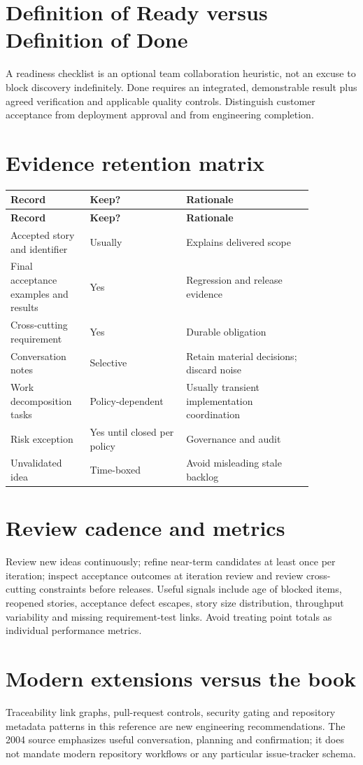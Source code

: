 \documentclass[11pt,letterpaper]{article}
\begin{document}
\section{Definition of Ready versus Definition of Done}
A readiness checklist is an optional team collaboration heuristic, not an excuse to block discovery indefinitely. Done requires an integrated, demonstrable result plus agreed verification and applicable quality controls. Distinguish customer acceptance from deployment approval and from engineering completion.

\section{Evidence retention matrix}
\begin{longtable}{|p{0.20\linewidth}|p{0.29\linewidth}|p{0.37\linewidth}|}\hline
\textbf{Record} & \textbf{Keep?} & \textbf{Rationale} \\ \hline\endfirsthead\hline
\textbf{Record} & \textbf{Keep?} & \textbf{Rationale} \\ \hline\endhead
Accepted story and identifier & Usually & Explains delivered scope \\ \hline
Final acceptance examples and results & Yes & Regression and release evidence \\ \hline
Cross-cutting requirement & Yes & Durable obligation \\ \hline
Conversation notes & Selective & Retain material decisions; discard noise \\ \hline
Work decomposition tasks & Policy-dependent & Usually transient implementation coordination \\ \hline
Risk exception & Yes until closed per policy & Governance and audit \\ \hline
Unvalidated idea & Time-boxed & Avoid misleading stale backlog \\ \hline
\end{longtable}
\section{Review cadence and metrics}
Review new ideas continuously; refine near-term candidates at least once per iteration; inspect acceptance outcomes at iteration review and review cross-cutting constraints before releases. Useful signals include age of blocked items, reopened stories, acceptance defect escapes, story size distribution, throughput variability and missing requirement-test links. Avoid treating point totals as individual performance metrics.

\section{Modern extensions versus the book}
Traceability link graphs, pull-request controls, security gating and repository metadata patterns in this reference are new engineering recommendations. The 2004 source emphasizes useful conversation, planning and confirmation; it does not mandate modern repository workflows or any particular issue-tracker schema.
\end{document}
